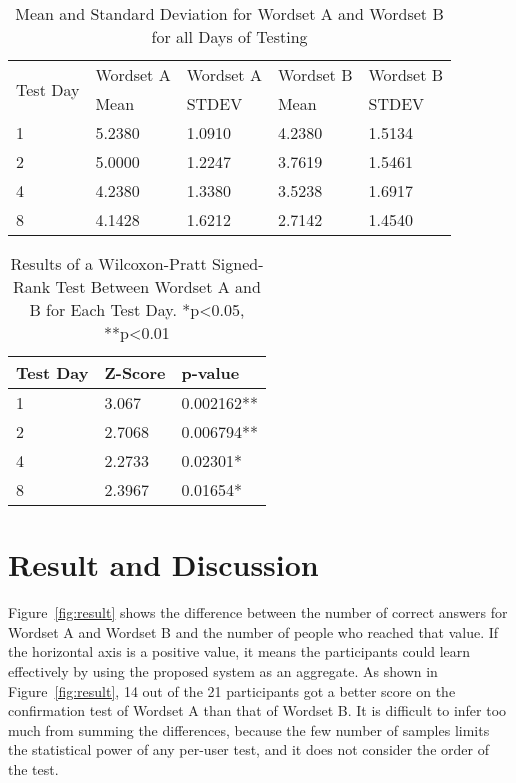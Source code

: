 \documentclass[sigchi]{acmart}
\begin{document}
\begin{table}[!t]
	\centering
		\caption{Mean and Standard Deviation for Wordset A and Wordset B for all Days of Testing}
		\begin{tabular}{lllll}
            \toprule
            \multirow{2}{*}{Test Day} & Wordset A & Wordset A & Wordset B & Wordset B\\
             & Mean & STDEV & Mean & STDEV\\
            \midrule
            1 & 5.2380 & 1.0910 & 4.2380 & 1.5134\\
            2 & 5.0000 & 1.2247 & 3.7619 & 1.5461\\
            4 & 4.2380 & 1.3380 & 3.5238 & 1.6917\\
            8 & 4.1428 & 1.6212 & 2.7142 & 1.4540\\
          \bottomrule
        \end{tabular}
		\label{test:stats}
\end{table}

\begin{table}[!t]
	\centering
		\caption{Results of a Wilcoxon-Pratt Signed-Rank Test Between Wordset A and B for Each Test Day. *p<0.05, **p<0.01}
		\begin{tabular}{lll}
            \toprule
            Test Day & Z-Score & p-value\\
            \midrule
            1 & 3.067 & 0.002162**\\
            2 & 2.7068 & 0.006794**\\
            4 & 2.2733 & 0.02301*\\
            8 & 2.3967 & 0.01654*\\
          \bottomrule
        \end{tabular}
		\label{test:results}
\end{table}

\section{Result and Discussion}
Figure~\ref{fig:result} shows the difference between the number of correct answers for Wordset A and Wordset B and the number of people who reached that value. If the horizontal axis is a positive value, it means the participants could learn effectively by using the proposed system as an aggregate. As shown in Figure~\ref{fig:result}, 14 out of the 21 participants got a better score on the confirmation test of Wordset A than that of Wordset B. It is difficult to infer too much from summing the differences, because the few number of samples limits the statistical power of any per-user test, and it does not consider the order of the test.
\end{document}
